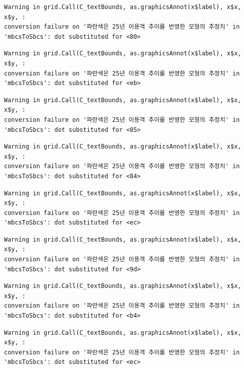 \documentclass[
  letterpaper,
  DIV=11,
  numbers=noendperiod]{scrreprt}
\begin{document}
\begin{verbatim}
Warning in grid.Call(C_textBounds, as.graphicsAnnot(x$label), x$x, x$y, :
conversion failure on '파란색은 25년 이용객 추이를 반영한 모형의 추정치' in
'mbcsToSbcs': dot substituted for <80>
\end{verbatim}

\begin{verbatim}
Warning in grid.Call(C_textBounds, as.graphicsAnnot(x$label), x$x, x$y, :
conversion failure on '파란색은 25년 이용객 추이를 반영한 모형의 추정치' in
'mbcsToSbcs': dot substituted for <eb>
\end{verbatim}

\begin{verbatim}
Warning in grid.Call(C_textBounds, as.graphicsAnnot(x$label), x$x, x$y, :
conversion failure on '파란색은 25년 이용객 추이를 반영한 모형의 추정치' in
'mbcsToSbcs': dot substituted for <85>
\end{verbatim}

\begin{verbatim}
Warning in grid.Call(C_textBounds, as.graphicsAnnot(x$label), x$x, x$y, :
conversion failure on '파란색은 25년 이용객 추이를 반영한 모형의 추정치' in
'mbcsToSbcs': dot substituted for <84>
\end{verbatim}

\begin{verbatim}
Warning in grid.Call(C_textBounds, as.graphicsAnnot(x$label), x$x, x$y, :
conversion failure on '파란색은 25년 이용객 추이를 반영한 모형의 추정치' in
'mbcsToSbcs': dot substituted for <ec>
\end{verbatim}

\begin{verbatim}
Warning in grid.Call(C_textBounds, as.graphicsAnnot(x$label), x$x, x$y, :
conversion failure on '파란색은 25년 이용객 추이를 반영한 모형의 추정치' in
'mbcsToSbcs': dot substituted for <9d>
\end{verbatim}

\begin{verbatim}
Warning in grid.Call(C_textBounds, as.graphicsAnnot(x$label), x$x, x$y, :
conversion failure on '파란색은 25년 이용객 추이를 반영한 모형의 추정치' in
'mbcsToSbcs': dot substituted for <b4>
\end{verbatim}

\begin{verbatim}
Warning in grid.Call(C_textBounds, as.graphicsAnnot(x$label), x$x, x$y, :
conversion failure on '파란색은 25년 이용객 추이를 반영한 모형의 추정치' in
'mbcsToSbcs': dot substituted for <ec>
\end{verbatim}
\end{document}
